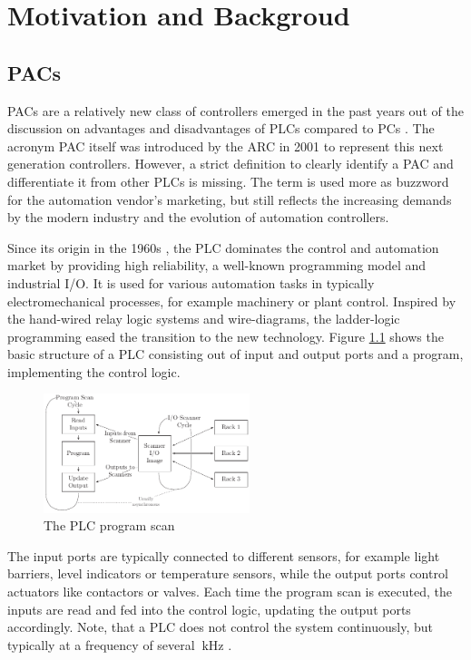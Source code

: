 \chapter{Motivation and Backgroud}

\section{\aclp{PAC}}
\aclp{PAC} are a relatively new class of controllers emerged in the past years
out of the discussion on advantages and disadvantages of \acp{PLC} compared to
\acp{PC} \citep{bel05}. The acronym \ac{PAC} itself was introduced by the
\ac{ARC} in 2001 \citep{pay13} to represent this next generation controllers.
However, a strict definition to clearly identify a \ac{PAC} and differentiate
it from other \acp{PLC} is missing. The term is used more as buzzword for the
automation vendor's marketing, but still reflects the increasing demands by
the modern industry and the evolution of automation controllers. 

Since its origin in the 1960s \citep{par99}, the \ac{PLC} dominates the
control and automation market by providing high reliability, a well-known
programming model and industrial I/O. It is used for various automation tasks
in typically electromechanical processes, for example machinery or plant
control. Inspired by the hand-wired relay logic systems and wire-diagrams, the
ladder-logic programming eased the transition to the new technology. Figure
\ref{fig:plc} shows the basic structure of a \ac{PLC} consisting out of input
and output ports and a program, implementing the control logic.
\begin{figure}[tb]
	\centering
	\includegraphics[width=6cm]{../figures/plc}
	\caption{The \acs{PLC} program scan \citep[adapted from][]{par99}}
	\label{fig:plc}
\end{figure}
The input ports are typically connected to different sensors, for example
light barriers, level indicators or temperature sensors, while the output
ports control actuators like contactors or valves. Each time the program scan
is executed, the inputs are read and fed into the control logic, updating the
output ports accordingly. Note, that a \ac{PLC} does not control the system
continuously, but typically at a frequency of several $\SI{}{\kilo\hertz}$
\citep{par99}.

